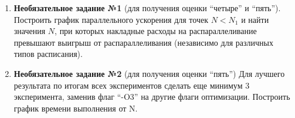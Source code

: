 \begin{enumerate}
     вычислительную сложность алгоритма до и после распараллеливания, сравнить полученные результаты.
    
     иллюстрации того, что программа действительно распараллелилась, привести график загрузки процессора (ядер) от времени при выполнении программы при $N = N_1$ для лучшего варианта распараллеливания. Для получения графика можно как написать скрипт, так и просто сделать скриншот диспетчера задач, указав на скриншоте моменты начала и окончания эксперимента (в отчёте нужно привести текст скрипта или название использованного диспетчера). Недостаточно привести однократное моментальное измерение загрузки утилитой htop, т.к. требуется привести график изменения загрузки за всё время выполнения программы.
    
     отчёт о проделанной работе.
    
     к устным вопросам на защите.
    
    \item\textbf{Необязательное задание №1} (для получения оценки ``четыре'' и ``пять''). Построить график параллельного ускорения для точек $N < N_1$ и найти значения $N$, при которых накладные расходы на распараллеливание превышают выигрыш от распараллеливания (независимо для различных типов расписания).
    
    \item\textbf{Необязательное задание №2} (для получения оценки ``пять'') Для лучшего результата по итогам всех экспериментов сделать еще минимум 3 эксперимента, заменив флаг ``-O3'' на другие флаги оптимизации. Построить график времени выполнения от N.
\end{enumerate}